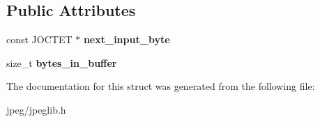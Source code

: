 \subsection*{Public Attributes}
\begin{DoxyCompactItemize}
\item 
const J\+O\+C\+T\+ET $\ast$ {\bfseries next\+\_\+input\+\_\+byte}\hypertarget{structjpeg__source__mgr_aad884e7f4ba7496ab0f56c942c7585c1}{}\label{structjpeg__source__mgr_aad884e7f4ba7496ab0f56c942c7585c1}

\item 
size\+\_\+t {\bfseries bytes\+\_\+in\+\_\+buffer}\hypertarget{structjpeg__source__mgr_a8ecb72557c1c9666d77fffea074282a4}{}\label{structjpeg__source__mgr_a8ecb72557c1c9666d77fffea074282a4}

\end{DoxyCompactItemize}


The documentation for this struct was generated from the following file\+:\begin{DoxyCompactItemize}
\item 
jpeg/jpeglib.\+h\end{DoxyCompactItemize}
